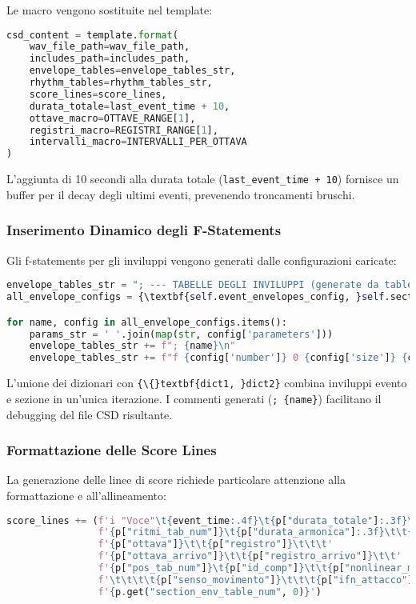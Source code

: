 Le macro vengono sostituite nel template:

\begin{lstlisting}[language=Python]
csd_content = template.format(
    wav_file_path=wav_file_path,
    includes_path=includes_path,
    envelope_tables=envelope_tables_str,
    rhythm_tables=rhythm_tables_str,
    score_lines=score_lines,
    durata_totale=last_event_time + 10,
    ottave_macro=OTTAVE_RANGE[1],
    registri_macro=REGISTRI_RANGE[1],
    intervalli_macro=INTERVALLI_PER_OTTAVA
)
\end{lstlisting}

L'aggiunta di 10 secondi alla durata totale (\texttt{last\_event\_time + 10}) fornisce un buffer per il decay degli ultimi eventi, prevenendo troncamenti bruschi.
\subsubsection{Inserimento Dinamico degli F-Statements}
Gli f-statements per gli inviluppi vengono generati dalle configurazioni caricate:

\begin{lstlisting}[language=Python]
envelope_tables_str = "; --- TABELLE DEGLI INVILUPPI (generate da tables.yaml) ---\n"
all_envelope_configs = {\textbf{self.event_envelopes_config, }self.section_envelopes_config}

for name, config in all_envelope_configs.items():
    params_str = ' '.join(map(str, config['parameters']))
    envelope_tables_str += f"; {name}\n"
    envelope_tables_str += f"f {config['number']} 0 {config['size']} {config['gen_routine']} {params_str}\n"
\end{lstlisting}

L'unione dei dizionari con \texttt{\{\textbackslash\{\}textbf\{dict1, \}dict2\}} combina inviluppi evento e sezione in un'unica iterazione. I commenti generati (\texttt{; \{name\}}) facilitano il debugging del file CSD risultante.
\subsubsection{Formattazione delle Score Lines}
La generazione delle linee di score richiede particolare attenzione alla formattazione e all'allineamento:

\begin{lstlisting}[language=Python]
score_lines += (f'i "Voce"\t{event_time:.4f}\t{p["durata_totale"]:.3f}\t'
                f'{p["ritmi_tab_num"]}\t{p["durata_armonica"]:.3f}\t\t{p["dynamic_index"]:.6f}\t'
                f'{p["ottava"]}\t\t{p["registro"]}\t\t\t'
                f'{p["ottava_arrivo"]}\t\t{p["registro_arrivo"]}\t\t'
                f'{p["pos_tab_num"]}\t{p["id_comp"]}\t\t{p["nonlinear_mode"]}'
                f'\t\t\t\t{p["senso_movimento"]}\t\t\t{p["ifn_attacco"]}\t\t\t'
                f'{p.get("section_env_table_num", 0)}')
\end{lstlisting}

